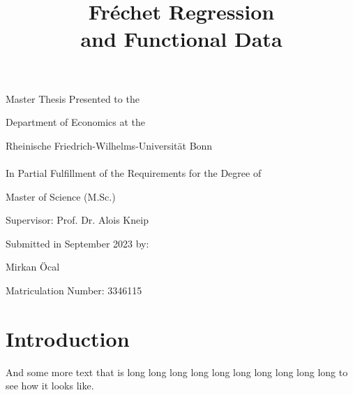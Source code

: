 \documentclass[12pt, a4paper, bibtotoc, liststotoc]{scrartcl}
\begin{document}
\begin{titlepage}
    \title{
        Fréchet Regression \\
        and Functional Data
    }
    \vspace{\fill}
    \author{}
    \date{}
    \maketitle

    \vspace{\fill}
    \begin{center}
        \large
        Master Thesis Presented to the

        Department of Economics at the

        Rheinische Friedrich-Wilhelms-Universität Bonn \\
        \ \\

        In Partial Fulfillment of the Requirements for the Degree of

        Master of Science (M.Sc.)

        \vspace{\fill}
        Supervisor: Prof. Dr. Alois Kneip

        \vspace{\fill}
        Submitted in September 2023 by:

        Mirkan Öcal

        Matriculation Number: 3346115
    \end{center}

    \thispagestyle{empty}
\end{titlepage}


\newpage %
\tableofcontents    %
\listoftables       %
\listoffigures      %

\newpage
{}

\section{Introduction}
\label{sec:introduction}

\citet{HorvathKokoszka2012}
\citet{HallHorowitz2007}
\citet{PetersenMüller2019}
\citet{VanDerVaartWellner1996}
\citet{Bosq2000}
\citet{HastiTibshiraniFriedman2009}
\citet{Boor2001}

And some more text that is long long long long long long long long long long to see how
it looks like.
\end{document}
